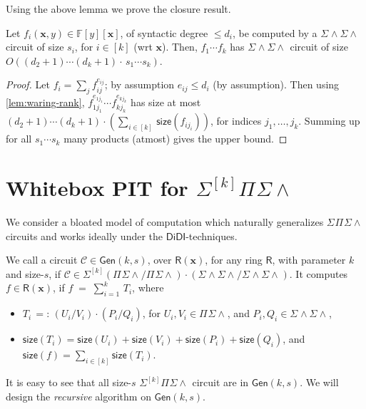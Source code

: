 \documentclass[10pt,a4paper]{article}
\newcommand{\DiDI}{\mathsf{DiDI}}
\newcommand{\F}{\mathbb{F}}
\newcommand{\ringR}{\mathsf{R}}
\newcommand{\x}{{\boldsymbol x}}
\newcommand{\calC}{\mathcal{C}}
\newcommand{\size}{\mathsf{size}}
\newcommand{\PSU}[2]{\Pi^{#1} \Sigma\wedge^{#2}}
\newcommand{\SPSU}[3]{\Sigma^{#1} \Pi^{#2} \Sigma \wedge^{#3}}
\newcommand{\SWSU}[2]{\Sigma^{#1}\!\wedge\!\Sigma\!\wedge^{#2}}
\newcommand{\Gen}[2]{\mathsf{Gen}(#1,#2)}
\numberwithin{equation}{section}
\begin{document}
Using the above lemma we prove the closure result.

\begin{lemma}\label{lem:prod-swsw}
Let $f_i(\x,y) \in \F[y][\x]$, of syntactic degree $\le d_i$, be computed by a $\SWSU{}{}$ circuit of size $s_i$, for $i \in [k]$ (wrt $\x$). Then, $f_1 \cdots f_k$ has $\SWSU{}{}$ circuit of size $O((d_2+1) \cdots (d_k+1)\cdot\,s_1\cdots s_k)$.
\end{lemma}

\begin{proof}
Let $f_i=\sum_{j} f_{ij}^{e_{ij}}$; by assumption $e_{ij} \le d_i$ (by assumption). Then using \autoref{lem:waring-rank}, $f_{1j_1}^{e_{1j_1}} \cdots f_{kj_k}^{e_{kj_k}}$ has size at most $(d_2+1) \cdots (d_k+1) \cdot \left(\sum_{i \in [k]}\,\size(f_{ij_i})\right)$, for indices $j_1,\hdots, j_k$. Summing up for all $s_1 \cdots s_k$ many products (atmost) gives the upper bound.
\end{proof}

\section{Whitebox PIT for \texorpdfstring{$\SPSU{[k]}{}{}$}{SkPSU}} \label{sec:pf:thm1}

We consider a bloated model of computation which naturally generalizes $\SPSU{}{}{}$ circuits and works ideally under the $\DiDI$-techniques.

\begin{definition}
We call a circuit $\calC \in \Gen{k}{s}$, over $\ringR(\x)$, for any ring $\ringR$, with parameter $k$ and size-$s$, if $\calC \in \Sigma^{[k]} (\PSU{}{}/\PSU{}{}) \cdot (\SWSU{}{}/\SWSU{}{})$. It computes $f \in \ringR(\x)$, if $f\;=\; \sum_{i=1}^k\, T_{i}$, where 
    \begin{itemize}
        \item $T_i\,=:\,(U_i/V_i)\cdot (P_i/Q_i)$, for $U_i, V_i \in \PSU{}{}$, and $P_i,Q_i \in \SWSU{}{}$,  
%
        \item $\size(T_i) = \size(U_i) + \size(V_i) + \size(P_i) + \size(Q_i)$, and $\size(f)=\sum_{i \in [k]} \size(T_i)$.
    \end{itemize}
\end{definition}

\noindent It is easy to see that all size-$s$ $\SPSU{[k]}{}{}$ circuit are in $\Gen{k}{s}$. We will design the \emph{recursive} algorithm on $\Gen{k}{s}$. 
\end{document}
